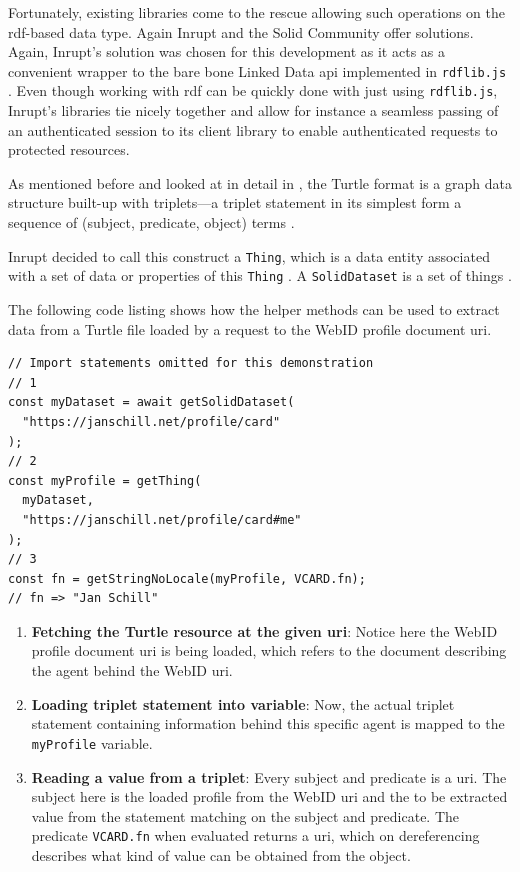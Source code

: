Fortunately, existing libraries come to the rescue allowing such operations on the \gls{rdf}-based data type. Again Inrupt and the Solid Community offer solutions. Again, Inrupt's solution was chosen for this development as it acts as a convenient wrapper to the bare bone Linked Data \gls{api} implemented in \texttt{rdflib.js} \cite{rdflib-js}. Even though working with \gls{rdf} can be quickly done with just using \texttt{rdflib.js}, Inrupt's libraries tie nicely together and allow for instance a seamless passing of an authenticated session to its client library to enable authenticated requests to protected resources.

As mentioned before and looked at in detail in \cite{cern-solid-investigation-spec}, the Turtle format is a graph data structure built-up with triplets---a triplet statement in its simplest form a sequence of (subject, predicate, object) terms \cite{Prud:hommeaux:14:RT}. 

Inrupt decided to call this construct a \texttt{Thing}, which is a data entity associated with a set of data or properties of this \texttt{Thing} \cite{thing}. A \texttt{SolidDataset} is a set of things \cite{inrupt-dataset}.

The following code listing shows how the helper methods can be used to extract data from a Turtle file loaded by a request to the WebID profile document \gls{uri}.

\begin{lstlisting}[language=Other,columns=fullflexible, caption={Basic usage of Inrupt's solid-client library.}, label={lst:2}]
// Import statements omitted for this demonstration
// 1
const myDataset = await getSolidDataset(
  "https://janschill.net/profile/card"
);
// 2
const myProfile = getThing(
  myDataset,
  "https://janschill.net/profile/card#me"
);
// 3
const fn = getStringNoLocale(myProfile, VCARD.fn);
// fn => "Jan Schill"
\end{lstlisting}

\begin{enumerate}
    \item \textbf{Fetching the Turtle resource at the given \gls{uri}}: Notice here the WebID profile document \gls{uri} is being loaded, which refers to the document describing the agent behind the WebID \gls{uri}.
    \item \textbf{Loading triplet statement into variable}: Now, the actual triplet statement containing information behind this specific agent is mapped to the \texttt{myProfile} variable.
    \item \textbf{Reading a value from a triplet}: Every subject and predicate is a \gls{uri}. The subject here is the loaded profile from the WebID \gls{uri} and the to be extracted value from the statement matching on the subject and predicate. The predicate \texttt{VCARD.fn} when evaluated returns a \gls{uri}, which on dereferencing describes what kind of value can be obtained from the object.
\end{enumerate}

